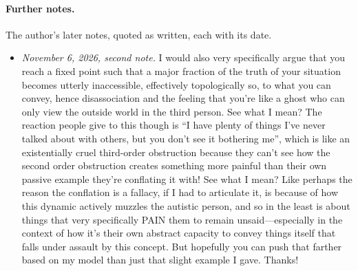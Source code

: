 \paragraph{Further notes.} The author's later notes, quoted as written, each with its date.
\begin{itemize}
\item \emph{November 6, 2026, second note.} I would also very specifically argue that you reach a fixed point such that a major fraction of the truth of your situation becomes utterly inaccessible, effectively topologically so, to what you can convey, hence disassociation and the feeling that you're like a ghost who can only view the outside world in the third person. See what I mean? The reaction people give to this though is ``I have plenty of things I've never talked about with others, but you don't see it bothering me'', which is like an existentially cruel third-order obstruction because they can't see how the second order obstruction creates something more painful than their own passive example they're conflating it with! See what I mean? Like perhaps the reason the conflation is a fallacy, if I had to articulate it, is because of how this dynamic actively muzzles the autistic person, and so in the least is about things that very specifically PAIN them to remain unsaid---especially in the context of how it's their own abstract capacity to convey things itself that falls under assault by this concept. But hopefully you can push that farther based on my model than just that slight example I gave. Thanks!

\end{itemize}
